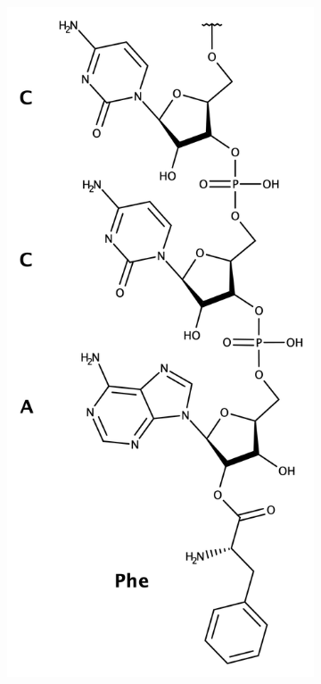 \begin{figure}
\begin{subfigure}[b]{0.3\textwidth}
         \caption{}
         \label{fig:tRNA_2d_struct}
     \end{subfigure}
     \hfill
     \begin{subfigure}[b]{0.2\textwidth}
         \centering
         \includegraphics[width=\textwidth]{figures/chap4/CCA_Phe.png}

\end{subfigure}
\end{figure}
